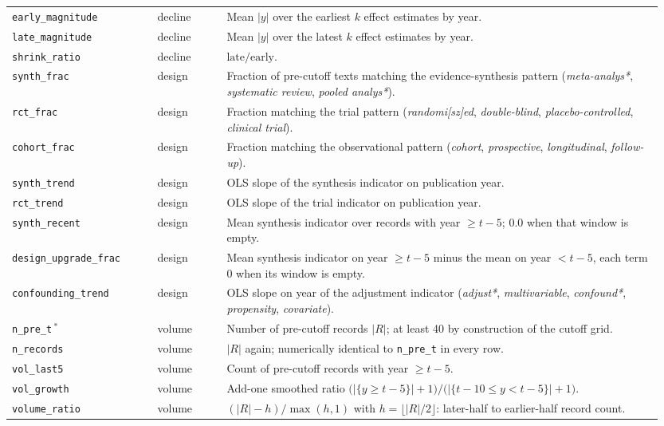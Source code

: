 \documentclass[11pt]{article}
\begin{document}
\begin{longtable}{@{}p{0.215\linewidth}p{0.105\linewidth}p{0.63\linewidth}@{}}
\texttt{early\_magnitude} & decline & Mean $|y|$ over the earliest $k$ effect estimates by year. \\
\texttt{late\_magnitude} & decline & Mean $|y|$ over the latest $k$ effect estimates by year. \\
\texttt{shrink\_ratio} & decline & $\mathrm{late}/\mathrm{early}$. \\
\texttt{synth\_frac} & design & Fraction of pre-cutoff texts matching the evidence-synthesis pattern (\emph{meta-analys*}, \emph{systematic review}, \emph{pooled analys*}). \\
\texttt{rct\_frac} & design & Fraction matching the trial pattern (\emph{randomi[sz]ed}, \emph{double-blind}, \emph{placebo-controlled}, \emph{clinical trial}). \\
\texttt{cohort\_frac} & design & Fraction matching the observational pattern (\emph{cohort}, \emph{prospective}, \emph{longitudinal}, \emph{follow-up}). \\
\texttt{synth\_trend} & design & OLS slope of the synthesis indicator on publication year. \\
\texttt{rct\_trend} & design & OLS slope of the trial indicator on publication year. \\
\texttt{synth\_recent} & design & Mean synthesis indicator over records with year $\ge t-5$; 0.0 when that window is empty. \\
\texttt{design\_upgrade\_frac} & design & Mean synthesis indicator on year $\ge t-5$ minus the mean on year $<t-5$, each term 0 when its window is empty. \\
\texttt{confounding\_trend} & design & OLS slope on year of the adjustment indicator (\emph{adjust*}, \emph{multivariable}, \emph{confound*}, \emph{propensity}, \emph{covariate}). \\
\texttt{n\_pre\_t}\,$^{\ast}$ & volume & Number of pre-cutoff records $|R|$; at least 40 by construction of the cutoff grid. \\
\texttt{n\_records} & volume & $|R|$ again; numerically identical to \texttt{n\_pre\_t} in every row. \\
\texttt{vol\_last5} & volume & Count of pre-cutoff records with year $\ge t-5$. \\
\texttt{vol\_growth} & volume & Add-one smoothed ratio $\big(|\{y\ge t{-}5\}|+1\big)/\big(|\{t{-}10\le y<t{-}5\}|+1\big)$. \\
\texttt{volume\_ratio} & volume & $(|R|-h)/\max(h,1)$ with $h=\lfloor|R|/2\rfloor$: later-half to earlier-half record count. \\

\end{longtable}
\end{document}
